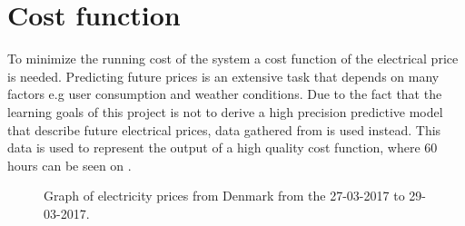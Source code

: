 \section{Cost function}\label{sec:cost_fkt}


To minimize the running cost of the system a cost function of the electrical price is needed. Predicting future prices is an extensive task that depends on many factors e.g user consumption and weather conditions. Due to the fact that the learning goals of this project is not to derive a high precision predictive model that describe future electrical prices, data gathered from \cite{Electrical_price} is used instead. This data is used to represent the output of a high quality cost function, where 60 hours can be seen on . 





	


\begin{figure}[H]
\centering

\caption{Graph of electricity prices from Denmark from the 27-03-2017 to 29-03-2017.}
\label{fig:electrical_price} 
\end{figure}

